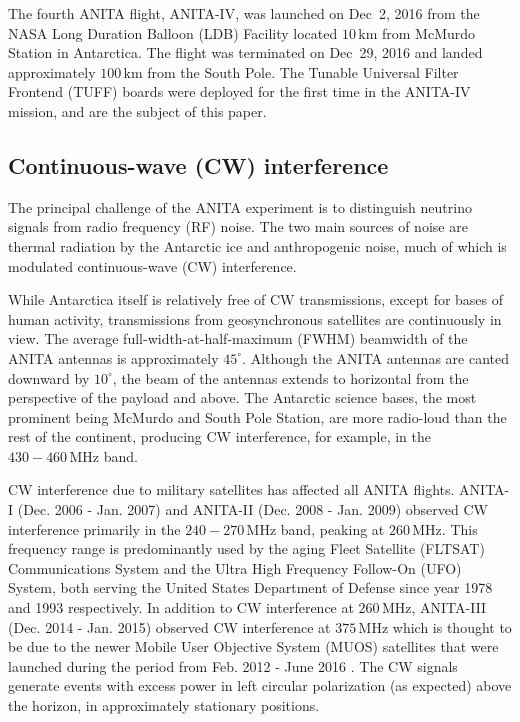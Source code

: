 \documentclass[preprint,12pt]{elsarticle}
\begin{document}
The fourth ANITA flight, ANITA-IV, was launched on Dec~2, 2016 from the NASA Long Duration Balloon
(LDB) Facility located $10\,\mbox{km}$ from McMurdo Station in Antarctica. 
The flight was terminated on Dec~29, 2016 and landed approximately $100\,\mbox{km}$ from the South Pole. 
The Tunable Universal Filter Frontend (TUFF) boards were deployed for the first time in the ANITA-IV mission,
and 
are the subject of this paper. 

\subsection{Continuous-wave (CW) interference} 
The principal challenge of the ANITA experiment is to distinguish neutrino signals from radio frequency (RF) noise. 
The two main sources of noise are thermal radiation by the Antarctic ice and anthropogenic noise, much of which is modulated continuous-wave (CW) interference. 

While Antarctica itself is relatively free of CW transmissions, except for bases of human activity, transmissions from geosynchronous satellites are continuously in view.
The average full-width-at-half-maximum (FWHM) beamwidth of the ANITA antennas is approximately $45^{\circ}$.
Although the ANITA antennas are canted downward by $10^{\circ}$, the beam of the antennas extends to horizontal from the perspective of the payload and
above.  
The Antarctic science bases, the most prominent being McMurdo and South Pole Station, are more radio-loud than the rest of the continent, producing CW interference, for example, in the $430-460\,\mbox{MHz}$ band. 

CW interference due to military satellites has affected all ANITA flights.
ANITA-I (Dec. 2006 - Jan. 2007) and ANITA-II (Dec. 2008 - Jan. 2009) observed CW interference primarily in the $240-270\,\mbox{MHz}$ band, peaking
at $260\,\mbox{MHz}$. This frequency range is predominantly used by the aging Fleet Satellite (FLTSAT) Communications System 
and the Ultra High Frequency Follow-On (UFO) System, both serving the 
United States Department of Defense since year 1978 and 1993 respectively.
In addition to CW interference at $260\,\mbox{MHz}$, ANITA-III (Dec. 2014 - Jan. 2015) observed CW interference at $375\,\mbox{MHz}$
which is thought to be due to
the newer Mobile User Objective System (MUOS) satellites that were launched during the period from Feb. 2012 - June 2016 \cite{milsat}.
The CW signals generate events with excess power in left circular polarization (as expected) above the horizon, in approximately stationary positions.
\end{document}
